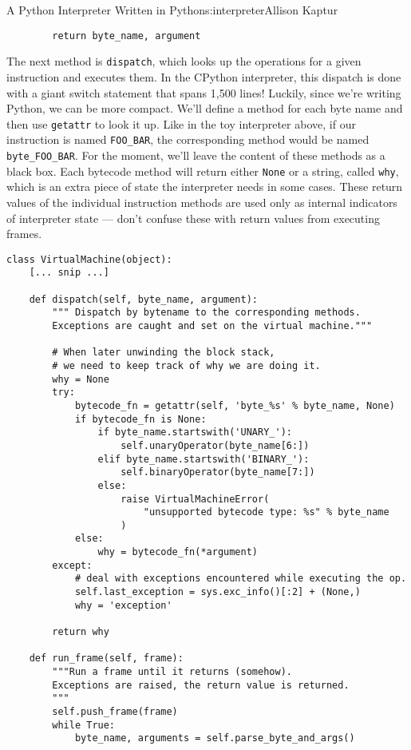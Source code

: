 \begin{aosachapter}{A Python Interpreter Written in Python}{s:interpreter}{Allison Kaptur}
\begin{verbatim}
        return byte_name, argument
\end{verbatim}

The next method is \texttt{dispatch}, which looks up the operations for
a given instruction and executes them. In the CPython interpreter, this
dispatch is done with a giant switch statement that spans 1,500 lines!
Luckily, since we're writing Python, we can be more compact. We'll
define a method for each byte name and then use \texttt{getattr} to look
it up. Like in the toy interpreter above, if our instruction is named
\texttt{FOO\_BAR}, the corresponding method would be named
\texttt{byte\_FOO\_BAR}. For the moment, we'll leave the content of
these methods as a black box. Each bytecode method will return either
\texttt{None} or a string, called \texttt{why}, which is an extra piece
of state the interpreter needs in some cases. These return values of the
individual instruction methods are used only as internal indicators of
interpreter state --- don't confuse these with return values from
executing frames.

\begin{verbatim}
class VirtualMachine(object):
    [... snip ...]

    def dispatch(self, byte_name, argument):
        """ Dispatch by bytename to the corresponding methods.
        Exceptions are caught and set on the virtual machine."""

        # When later unwinding the block stack,
        # we need to keep track of why we are doing it.
        why = None
        try:
            bytecode_fn = getattr(self, 'byte_%s' % byte_name, None)
            if bytecode_fn is None:
                if byte_name.startswith('UNARY_'):
                    self.unaryOperator(byte_name[6:])
                elif byte_name.startswith('BINARY_'):
                    self.binaryOperator(byte_name[7:])
                else:
                    raise VirtualMachineError(
                        "unsupported bytecode type: %s" % byte_name
                    )
            else:
                why = bytecode_fn(*argument)
        except:
            # deal with exceptions encountered while executing the op.
            self.last_exception = sys.exc_info()[:2] + (None,)
            why = 'exception'

        return why

    def run_frame(self, frame):
        """Run a frame until it returns (somehow).
        Exceptions are raised, the return value is returned.
        """
        self.push_frame(frame)
        while True:
            byte_name, arguments = self.parse_byte_and_args()


\end{verbatim}
\end{aosachapter}
